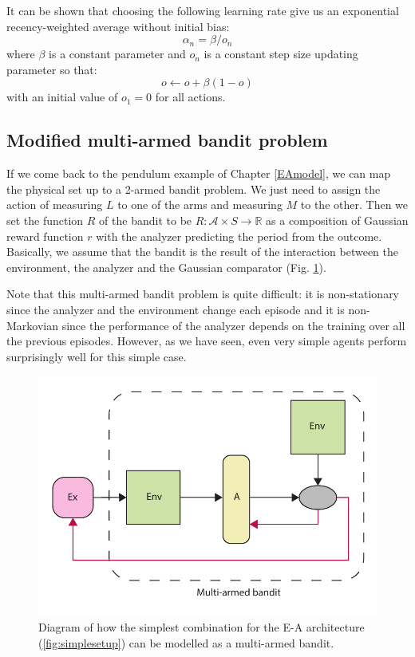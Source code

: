 \documentclass[11pt,a4paper,twoside]{report}
\newcommand{\+}{\textnormal{+} }
\theoremstyle{definition}
\numberwithin{equation}{chapter}
\begin{document}
  It can be shown that choosing the following learning rate give us an
  exponential recency-weighted average without initial bias:
  \begin{equation}
    \alpha_n = \beta/o_n
  \end{equation}
  where $\beta$ is a constant parameter and $o_n$ is a constant step size
  updating parameter so that:
  \begin{equation}
    o \gets o + \beta(1-o) 
  \end{equation}
  with an initial value of $o_1=0$ for all actions.

\subsection{Modified multi-armed bandit problem}

If we come back to the pendulum example of Chapter \ref{EAmodel}, we can map the
physical set up to a 2-armed bandit problem. We just need to assign the action
of  measuring $L$ to one of the arms and measuring $M$ to the other. Then we set
the function $R$ of the bandit to be $R:\mathcal{A}\times S\rightarrow
\mathbb{R}$ as a composition of Gaussian reward function $r$ with the analyzer
predicting the period from the outcome. Basically, we assume that the bandit is
the result of the interaction between the environment, the analyzer and the
Gaussian comparator (Fig. \ref{fig:Bandit-EA}). \par Note that this multi-armed
bandit problem is quite difficult: it is non-stationary since the analyzer and
the environment change each episode and it is non-Markovian since the
performance of the analyzer depends on the training over all the previous
episodes. However, as we have seen, even very simple agents perform surprisingly
well for this simple case.


\begin{figure}
  \centering 
\includegraphics[scale=0.75]{figures/Bandit-EA.pdf}
\caption{Diagram of how the simplest combination for the E-A architecture
(\ref{fig:simplesetup}) can be modelled as a multi-armed bandit.}
\label{fig:Bandit-EA}
\end{figure}
\end{document}
